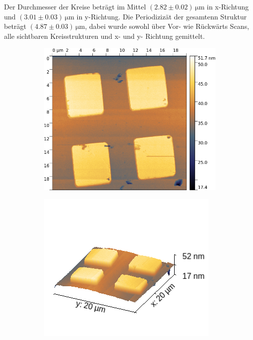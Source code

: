 Der Durchmesser der Kreise beträgt im Mittel $(2.82\pm 0.02)\,\si{\micro\meter}$ in x-Richtung und $(3.01\pm 0.03)\,\si{\micro\meter}$ in y-Richtung. Die Periodizizät der gesamtenn Struktur beträgt $(4.87\pm 0.03)\,\si{\micro\meter}$,
dabei wurde sowohl über Vor- wie Rückwärts Scans, alle sichtbaren Kreisstrukturen und x- und y- Richtung gemittelt.

\begin{figure}[H]
    \centering
    \begin{subfigure}{0.49\textwidth}
        \includegraphics[width=\textwidth]{bilder/Mikrostruktur/Quadrat_Vor_2D.png}
        \caption{}
    \end{subfigure}
    \begin{subfigure}{0.49\textwidth}
        \includegraphics[width=\textwidth]{bilder/Mikrostruktur/Quadrat_Vor_3D.png}

\end{subfigure}
\end{figure}
